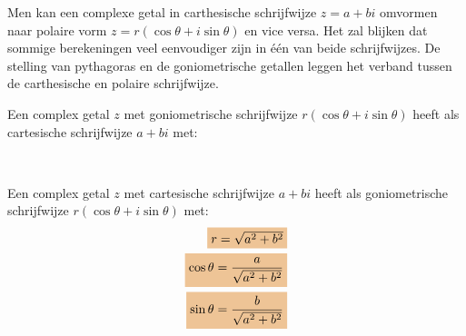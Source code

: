\documentclass{ximera}
\begin{document}
%
 
 
 

 
 
Men kan een complexe getal in carthesische schrijfwijze $z=a+bi$ omvormen naar polaire vorm $z = r(\cos \theta + i\sin\theta)$ en vice versa. Het zal blijken dat sommige berekeningen veel eenvoudiger zijn in één van beide schrijfwijzes. De stelling van pythagoras en de goniometrische getallen leggen het verband tussen de carthesische en polaire schrijfwijze. 

\begin{proposition}\label{eig:transformatie_complexe_getallen} \nl
     
    Een complex getal $z$ met goniometrische schrijfwijze $r(\cos \theta + i\sin\theta)$ heeft als cartesische schrijfwijze $a+bi$ met:
    \begin{center}
        \\
    \end{center}
    Een complex getal $z$ met cartesische schrijfwijze $a+bi$ heeft als goniometrische schrijfwijze $r(\cos \theta + i\sin\theta)$ met:
    \begin{align*}
    \important{r = \sqrt{a^2+b^2}} \\
    \important{\cos\theta  = \dfrac{a}{\sqrt{a^2+b^2}}}\\
    \important{\sin\theta  = \dfrac{b}{\sqrt{a^2+b^2}}}
    \end{align*}

\end{proposition}
\end{document}
